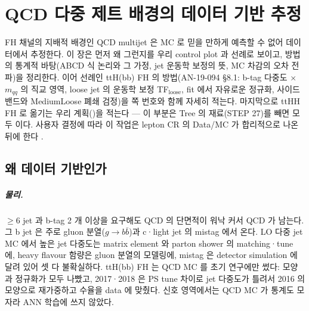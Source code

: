 \chapter{QCD 다중 제트 배경의 데이터 기반 추정}\label{ch:qcd}

FH 채널의 지배적 배경인 QCD multijet 은 MC 로 믿을 만하게 예측할 수 없어 데이터에서 추정한다. 이 장은 먼저 왜 그런지를 우리 control plot 과
선례로 보이고, 방법의 통계적 바탕(ABCD 식 논리와 그 가정, jet 운동학 보정의 뜻, MC 차감의 오차 전파)을 정리한다. 이어 선례인 ttH(bb) FH 의
방법(AN-19-094 §8.1: b-tag 다중도 $\times$ $m_{qq}$ 의 직교 영역, loose jet 의 운동학 보정 TF$_{\text{loose}}$, fit 에서 자유로운 정규화, 사이드밴드와
MediumLoose 폐쇄 검정)을 쪽 번호와 함께 자세히 적는다. 마지막으로 ttHH FH 로 옮기는 우리 계획()을 적는다 — 이 부분은
Tree 의 재료(STEP 27)를 빼면 모두 \tagplan{} 이다. 사용자 결정에 따라 이 작업은 lepton CR 의 Data/MC 가 합리적으로 나온 뒤에 한다
.

\section{왜 데이터 기반인가}\label{sec:qcd-why}

\paragraph{물리.}
$\ge6$ jet 과 b-tag 2 개 이상을 요구해도 QCD 의 단면적이 워낙 커서 QCD 가 남는다. 그 b jet 은 주로 gluon 분열($g\to b\bar b$)과 c·light jet 의
mistag 에서 온다. LO 다중 jet MC 에서 높은 jet 다중도는 matrix element 와 parton shower 의 matching·tune 에, heavy flavour 함량은 gluon 분열의
모델링에, mistag 은 detector simulation 에 달려 있어 셋 다 불확실하다. ttH(bb) FH 는 QCD MC 를 초기 연구에만 썼다: 모양과 정규화가 모두
나빴고, 2017·2018 은 PS tune 차이로 jet 다중도가 틀려서 2016 의 모양으로 재가중하고 수율을 data 에 맞췄다.
신호 영역에서는 QCD MC 가 통계도 모자라 ANN 학습에 쓰지 않았다.


